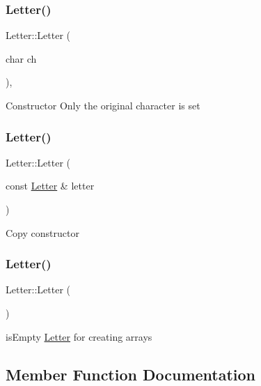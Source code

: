 \subsubsection{\texorpdfstring{Letter()}{Letter()}\hspace{0.1cm}{\footnotesize\ttfamily [1/3]}}
{\footnotesize\ttfamily Letter\+::\+Letter (\begin{DoxyParamCaption}\item[{char}]{ch }\end{DoxyParamCaption})\hspace{0.3cm}{\ttfamily [inline]}, {\ttfamily [explicit]}}

Constructor Only the original character is set \mbox{\label{class_letter_a20efe02d84add2ca7b89e43f629bc128}} 
\subsubsection{\texorpdfstring{Letter()}{Letter()}\hspace{0.1cm}{\footnotesize\ttfamily [2/3]}}
{\footnotesize\ttfamily Letter\+::\+Letter (\begin{DoxyParamCaption}\item[{const \hyperlink{class_letter}{Letter} \&}]{letter }\end{DoxyParamCaption})\hspace{0.3cm}{\ttfamily [inline]}}

Copy constructor \mbox{\label{class_letter_ac390dd9bfbdd7a0965cd74b3eccee010}} 
\subsubsection{\texorpdfstring{Letter()}{Letter()}\hspace{0.1cm}{\footnotesize\ttfamily [3/3]}}
{\footnotesize\ttfamily Letter\+::\+Letter (\begin{DoxyParamCaption}{ }\end{DoxyParamCaption})\hspace{0.3cm}{\ttfamily [inline]}}

is\+Empty \hyperlink{class_letter}{Letter} for creating arrays 

\subsection{Member Function Documentation}
\mbox{\label{class_letter_af52f553dafb323384339dcfaa1a7eaa6}} 

